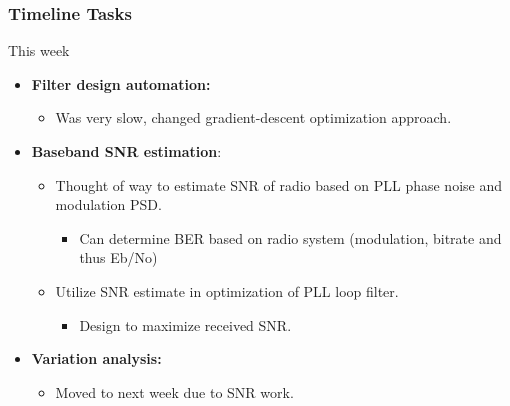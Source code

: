 \documentclass[t, screen, aspectratio=43]{beamer}
\begin{document}
\begin{frame}
	\frametitle{Timeline Tasks}
	\begin{block}{This week}
		\begin{itemize}
			\footnotesize
			\item \textbf{Filter design automation:}
			\begin{itemize}
				\footnotesize
				\item Was very slow, changed gradient-descent optimization approach.
			\end{itemize} 
			\item \textbf{Baseband SNR estimation}:
			\begin{itemize}
				\footnotesize
				\item Thought of way to estimate SNR of radio based on PLL phase noise and modulation PSD.
				\begin{itemize}
					\scriptsize
					\item Can determine BER based on radio system (modulation, bitrate and thus Eb/No)
				\end{itemize}			
				\item Utilize SNR estimate in optimization of PLL loop filter.
				\begin{itemize}
					\scriptsize
					\item Design to maximize received SNR.
				\end{itemize}	
			\end{itemize} 
		\item \textbf{Variation analysis:}
		\begin{itemize}
			\footnotesize
			\item Moved to next week due to SNR work.
		\end{itemize} 
		\end{itemize}    
	\end{block}
\end{frame}

\end{document}

